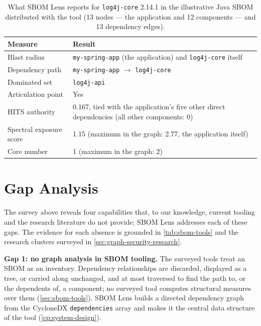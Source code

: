 \begin{table}[!htpb]
    \centering
    \small
    \caption[log4shell in an illustrative SBOM]{What SBOM Lens reports for \texttt{log4j-core} 2.14.1 in the illustrative Java SBOM distributed with the tool (13 nodes --- the application and 12 components --- and 13 dependency edges).}
    \label{tab:log4j-case}
    \begin{tabular}{lp{8.5cm}}
        \toprule
        \textbf{Measure} & \textbf{Result} \\
        \midrule
        Blast radius & \texttt{my-spring-app} (the application) and \texttt{log4j-core} itself \\
        Dependency path & \texttt{my-spring-app} \(\to\) \texttt{log4j-core} \\
        Dominated set & \texttt{log4j-api} \\
        Articulation point & Yes \\
        HITS authority & 0.167, tied with the application's five other direct dependencies (all other components: 0) \\
        Spectral exposure score & 1.15 (maximum in the graph: 2.77, the application itself) \\
        Core number & 1 (maximum in the graph: 2) \\
        \bottomrule
    \end{tabular}
\end{table}


\section{Gap Analysis}
\label{sec:gap-analysis}

The survey above reveals four capabilities that, to our knowledge, current tooling and the research literature do not provide; SBOM Lens addresses each of these gaps. The evidence for each absence is grounded in \autoref{tab:sbom-tools} and the research clusters surveyed in \autoref{sec:graph-security-research}.

\textbf{Gap 1: no graph analysis in SBOM tooling.} The surveyed tools treat an SBOM as an inventory. Dependency relationships are discarded, displayed as a tree, or carried along unchanged, and at most traversed to find the path to, or the dependents of, a component; no surveyed tool computes structural measures over them (\autoref{sec:sbom-tools}). SBOM Lens builds a directed dependency graph from the CycloneDX \texttt{dependencies} array and makes it the central data structure of the tool (\autoref{cp:system-design}).

